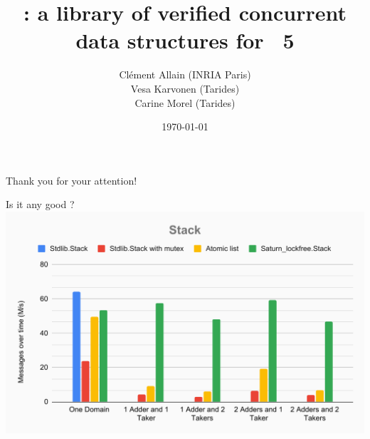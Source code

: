 \documentclass[xcolor=x11names]{beamer}
\title{\Saturn: a library of verified concurrent data structures for \OCaml~5}
\date{\today}
\author{
  Clément Allain (INRIA Paris) \\
  Vesa Karvonen (Tarides) \\
  Carine Morel (Tarides)
}
\begin{document}
\maketitle

% 





\begin{frame}
\LARGE
\centering
Thank you for your attention!
\end{frame}

\begin{frame}
  
\end{frame}
\begin{frame}{Is it any good ?}
  \centering
      \includegraphics[width=0.8\linewidth]{images/Stack.pdf}
    \end{frame}
  
\end{document}
